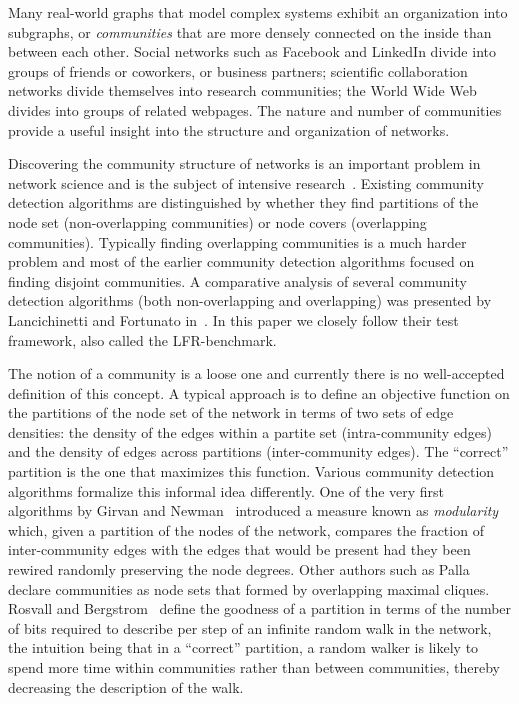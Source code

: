 Many real-world graphs that model complex systems exhibit an organization 
into subgraphs, or \textit{communities} that are more densely connected on the inside than between each other. 
Social networks such as Facebook and LinkedIn divide into groups of friends 
or coworkers, or business partners; scientific collaboration networks divide 
themselves into research communities; the World Wide Web divides into groups 
of related webpages. The nature and number of communities provide 
a useful insight into the structure and organization of networks. 

Discovering the community structure of networks is an 
important problem in network science and is the subject 
of intensive research~\cite{GN02, GN04, CNM04, RCC04, DM04, PDFV05, NL07, 
BGLL08, RB08, RN09}. Existing community detection algorithms are 
distinguished by whether they find partitions of the node set 
(non-overlapping communities) or node covers (overlapping communities). 
Typically finding overlapping communities is a much harder problem and most of the 
earlier community detection algorithms focused on finding disjoint 
communities. A comparative analysis of several community detection algorithms 
(both non-overlapping and overlapping) was presented by Lancichinetti and Fortunato 
in~\cite{LF09}. In this paper we closely follow their test framework, 
also called the LFR-benchmark.

The notion of a community is a loose one and currently there is no 
well-accepted definition of this concept. A typical approach is to define an 
objective function on the partitions of the node set of the network 
in terms of two sets of edge densities: the density of the 
edges within a partite set (intra-community edges) and the density of edges across partitions 
(inter-community edges). The ``correct'' partition is the one that maximizes this 
function. Various community detection algorithms formalize this
informal idea differently. One of the very first algorithms by
Girvan and Newman~\cite{GN02} introduced a measure known as \textit{modularity}
which, given a partition of the nodes of the network, compares the fraction of 
inter-community edges with the edges that would be present had they been 
rewired randomly preserving the node degrees. Other authors such as Palla 
\etal~\cite{PDFV05} declare communities as node sets that formed 
by overlapping maximal cliques. Rosvall and Bergstrom~\cite{RB08} 
define the goodness of a partition in terms of the number of bits required to 
describe per step of an infinite random walk in the network, the intuition being 
that in a ``correct'' partition, a random walker is likely to spend more time 
within communities rather than between communities, thereby decreasing the 
description of the walk.  

